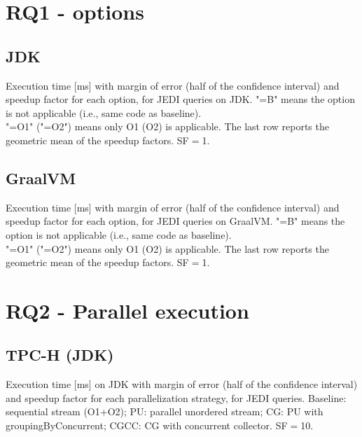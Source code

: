 \documentclass{article}
\begin{document}
\section{RQ1 - options}

\subsection{JDK}
\begin{table}[h!]
    \centering
    
\caption{Execution time [ms] with margin of error (half of the confidence interval) and speedup factor for each option, for JEDI queries on JDK.
    "=B" means the option is not applicable (i.e., same code as baseline).\\
    "=O1" ("=O2")
    means only O1 (O2) is applicable.
    The last row reports the geometric mean of the speedup factors. SF$=$1.}
\end{table}

\subsection{GraalVM}
\begin{table}[h!]
    \centering
    
\caption{Execution time [ms] with margin of error (half of the confidence interval) and speedup factor for each option, for JEDI queries on GraalVM.
    "=B" means the option is not applicable (i.e., same code as baseline).\\
    "=O1" ("=O2")
    means only O1 (O2) is applicable.
    The last row reports the geometric mean of the speedup factors. SF$=$1.}
\end{table}

\newpage

\section{RQ2 - Parallel execution}
\subsection{TPC-H (JDK)}
\begin{table}[h!]
    \centering
    
     \caption{Execution time [ms] on JDK with margin of error (half of the confidence interval)
      and speedup factor for each parallelization strategy, for JEDI queries.
      Baseline: sequential stream (O1+O2); PU: parallel unordered stream; CG: PU with groupingByConcurrent; CGCC: CG with concurrent collector. SF$=$10.}
\end{table}
\end{document}
